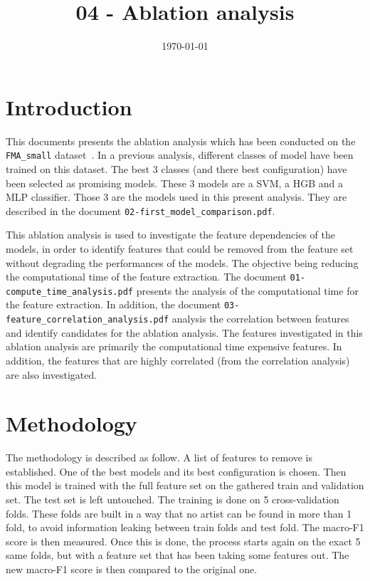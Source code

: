 \documentclass[11pt]{article}
\title{04 - Ablation analysis}
\author{}
\date{\today}
\begin{document}
\maketitle

\section{Introduction}
This documents presents the ablation analysis which has been conducted on the \texttt{FMA\_small} dataset~\cite{fma_dataset}. In a previous analysis, different classes of model have been trained on this dataset. The best 3 classes (and there best configuration) have been selected as promising models. These 3 models are a SVM, a HGB  and a MLP classifier. Those 3 are the models used in this present analysis. They are described in the document \texttt{02-first\_model\_comparison.pdf}.

This ablation analysis is used to investigate the feature dependencies of the models, in order to identify features that could be removed from the feature set without degrading the performances of the models. The objective being reducing the computational time of the feature extraction. The document \texttt{01-compute\_time\_analysis.pdf} presents the analysis of the computational time for the feature extraction. In addition, the document \texttt{03-feature\_correlation\_analysis.pdf} analysis the correlation between features and identify candidates for the ablation analysis. 
The features investigated in this ablation analysis are primarily the computational time expensive features. In addition, the features that are highly correlated (from the correlation analysis) are also investigated.


\section{Methodology}
\label{metho}
The methodology is described as follow. A list of features to remove is established. One of the best models and its best configuration is chosen. Then this model is trained with the full feature set on the gathered train and validation set. The test set is left untouched. The training is done on 5 cross-validation folds. These folds are built in a way that no artist can be found in more than 1 fold, to avoid information leaking between train folds and test fold. The macro-F1 score is then measured. Once this is done, the process starts again on the exact 5 same folds, but with a feature set that has been taking some features out. The new macro-F1 score is then compared to the original one.
\end{document}
